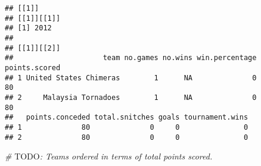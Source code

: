 \documentclass[
]{article}
\newenvironment{Shaded}{\begin{snugshade}}{\end{snugshade}}
\newcommand{\AlertTok}[1]{\textcolor[rgb]{0.94,0.16,0.16}{#1}}
\newcommand{\CommentTok}[1]{\textcolor[rgb]{0.56,0.35,0.01}{\textit{#1}}}
\begin{document}
\begin{verbatim}
## [[1]]
## [[1]][[1]]
## [1] 2012
## 
## [[1]][[2]]
##                     team no.games no.wins win.percentage points.scored
## 1 United States Chimeras        1      NA              0            80
## 2     Malaysia Tornadoes        1      NA              0            80
##   points.conceded total.snitches goals tournament.wins
## 1              80              0     0               0
## 2              80              0     0               0
\end{verbatim}

\begin{Shaded}
\begin{Highlighting}[]
\CommentTok{\# }\AlertTok{TODO}\CommentTok{: Teams ordered in terms of total points scored.}
\end{Highlighting}
\end{Shaded}
\end{document}

